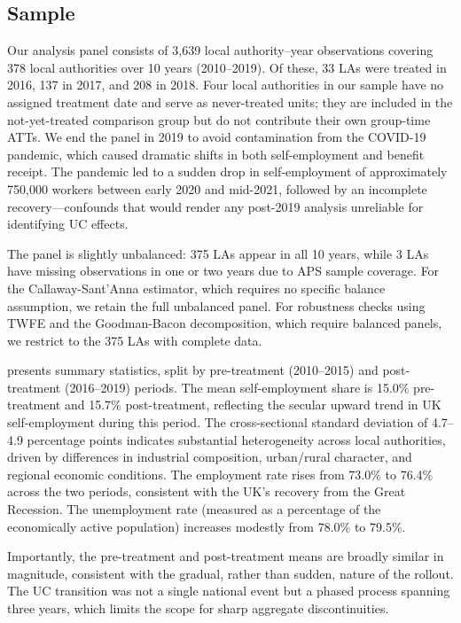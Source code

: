 \documentclass[12pt]{article}
\begin{document}
\subsection{Sample}

Our analysis panel consists of 3,639 local authority--year observations covering 378 local authorities over 10 years (2010--2019). Of these, 33 LAs were treated in 2016, 137 in 2017, and 208 in 2018. Four local authorities in our sample have no assigned treatment date and serve as never-treated units; they are included in the not-yet-treated comparison group but do not contribute their own group-time ATTs. We end the panel in 2019 to avoid contamination from the COVID-19 pandemic, which caused dramatic shifts in both self-employment and benefit receipt. The pandemic led to a sudden drop in self-employment of approximately 750,000 workers between early 2020 and mid-2021, followed by an incomplete recovery---confounds that would render any post-2019 analysis unreliable for identifying UC effects.

The panel is slightly unbalanced: 375 LAs appear in all 10 years, while 3 LAs have missing observations in one or two years due to APS sample coverage. For the Callaway-Sant'Anna estimator, which requires no specific balance assumption, we retain the full unbalanced panel. For robustness checks using TWFE and the Goodman-Bacon decomposition, which require balanced panels, we restrict to the 375 LAs with complete data.

 presents summary statistics, split by pre-treatment (2010--2015) and post-treatment (2016--2019) periods. The mean self-employment share is 15.0\% pre-treatment and 15.7\% post-treatment, reflecting the secular upward trend in UK self-employment during this period. The cross-sectional standard deviation of 4.7--4.9 percentage points indicates substantial heterogeneity across local authorities, driven by differences in industrial composition, urban/rural character, and regional economic conditions. The employment rate rises from 73.0\% to 76.4\% across the two periods, consistent with the UK's recovery from the Great Recession. The unemployment rate (measured as a percentage of the economically active population) increases modestly from 78.0\% to 79.5\%.

Importantly, the pre-treatment and post-treatment means are broadly similar in magnitude, consistent with the gradual, rather than sudden, nature of the rollout. The UC transition was not a single national event but a phased process spanning three years, which limits the scope for sharp aggregate discontinuities.
\end{document}
